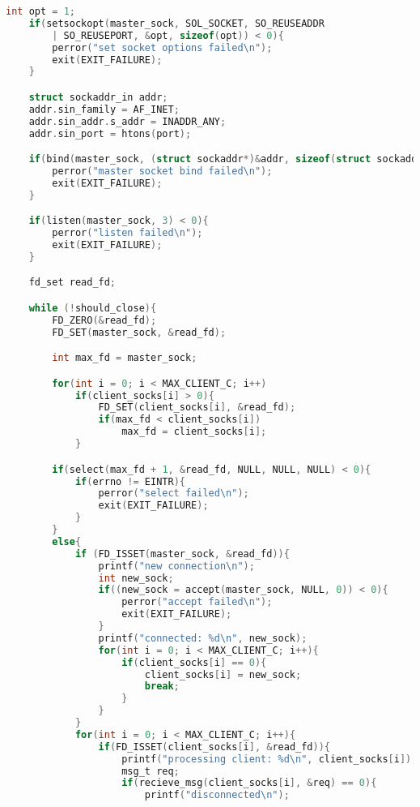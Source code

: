 \documentclass[12pt]{article}
\begin{document}
\begin{lstlisting}[language=C, basicstyle=\scriptsize]
    int opt = 1;
    if(setsockopt(master_sock, SOL_SOCKET, SO_REUSEADDR
        | SO_REUSEPORT, &opt, sizeof(opt)) < 0){
        perror("set socket options failed\n");
        exit(EXIT_FAILURE);
    }

    struct sockaddr_in addr;
    addr.sin_family = AF_INET;
    addr.sin_addr.s_addr = INADDR_ANY;
    addr.sin_port = htons(port);

    if(bind(master_sock, (struct sockaddr*)&addr, sizeof(struct sockaddr_in)) < 0){
        perror("master socket bind failed\n");
        exit(EXIT_FAILURE);
    }

    if(listen(master_sock, 3) < 0){
        perror("listen failed\n");
        exit(EXIT_FAILURE);
    }

    fd_set read_fd;

    while (!should_close){
        FD_ZERO(&read_fd);
        FD_SET(master_sock, &read_fd);

        int max_fd = master_sock;

        for(int i = 0; i < MAX_CLIENT_C; i++)
            if(client_socks[i] > 0){
                FD_SET(client_socks[i], &read_fd);
                if(max_fd < client_socks[i])
                    max_fd = client_socks[i];
            }

        if(select(max_fd + 1, &read_fd, NULL, NULL, NULL) < 0){
            if(errno != EINTR){
                perror("select failed\n");
                exit(EXIT_FAILURE);
            }
        }
        else{
            if (FD_ISSET(master_sock, &read_fd)){
                printf("new connection\n");
                int new_sock;
                if((new_sock = accept(master_sock, NULL, 0)) < 0){
                    perror("accept failed\n");
                    exit(EXIT_FAILURE);
                }
                printf("connected: %d\n", new_sock);
                for(int i = 0; i < MAX_CLIENT_C; i++){
                    if(client_socks[i] == 0){
                        client_socks[i] = new_sock;
                        break;
                    }
                }
            }
            for(int i = 0; i < MAX_CLIENT_C; i++){
                if(FD_ISSET(client_socks[i], &read_fd)){
                    printf("processing client: %d\n", client_socks[i]);
                    msg_t req;
                    if(recieve_msg(client_socks[i], &req) == 0){
                        printf("disconnected\n");


\end{lstlisting}
\end{document}
